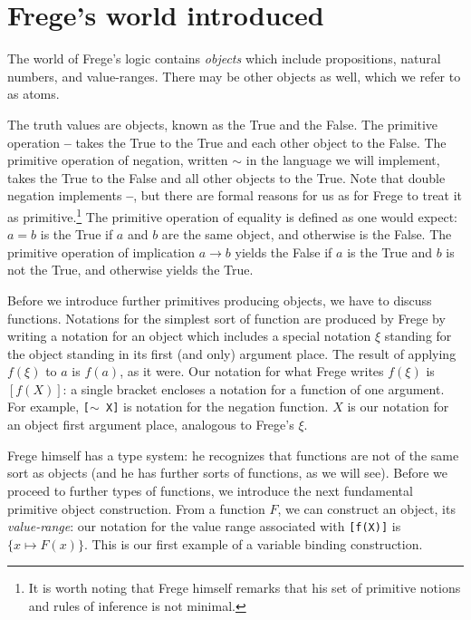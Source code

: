 \documentclass{article}
\begin{document}
\tableofcontents

\newpage

\section{Frege's world introduced}

The world of Frege's logic contains {\em objects\/} which include propositions, natural numbers, and value-ranges.  There may be other objects as well, which we refer to as atoms.

The truth values are objects, known as the True and the False.  The primitive operation {\bf --} takes the True to the True and each other object to the False.  The primitive operation of negation, written $\sim$ in the language we will implement, takes the True to the False
and all other objects to the True. Note that double negation implements {\bf --}, but there are formal reasons for us as for Frege to treat it as primitive.\footnote{It is worth noting that Frege himself remarks that his set of primitive notions and rules of inference is not minimal.} The primitive operation of equality is defined as one would expect:  $a=b$ is the True if $a$ and $b$ are the same object, and otherwise is the False.  The primitive operation of implication $a \rightarrow b$ yields the False if
$a$ is the True and $b$ is not the True, and otherwise yields the True.

Before we introduce further primitives producing objects, we have to discuss functions.  Notations for the simplest sort of function are produced by Frege by writing a notation for an object
which includes a special notation $\xi$ standing for the object standing in its first (and only) argument place.  The result of applying $f(\xi)$ to $a$ is $f(a)$, as it were.  Our notation for
what Frege writes $f(\xi)$ is $[f(X)]$:  a single bracket encloses a notation for a function of one argument.  For example, {\tt [$\sim$ X]} is notation for the negation function.  $X$ is our notation for an object first argument place, analogous to Frege's $\xi$.

Frege himself has a type system:  he recognizes that functions are not of the same sort as objects (and he has further sorts of functions, as we will see).  Before we proceed to further
types of functions, we introduce the next fundamental primitive object construction.  From a function $F$, we can construct an object, its {\em value-range\/}:  our notation for the
value range associated with {\tt [f(X)]} is $\{x \mapsto F(x)\}$.  This is our first example of a variable binding construction.
\end{document}
